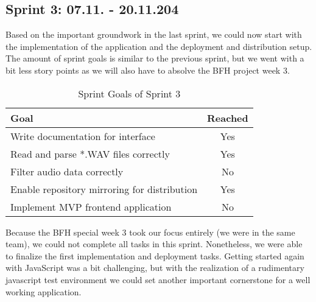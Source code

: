 \subsection{Sprint 3: 07.11. - 20.11.204}\label{subsec:sprint-3}
Based on the important groundwork in the last sprint, we could now start with the implementation of the application
and the deployment and distribution setup.
The amount of sprint goals is similar to the previous sprint, but we went with a bit less story points as we will also
have to absolve the BFH project week 3.
\begin{table}[H]
    \centering
    \begin{tabularx}{\textwidth}{X c}
        \toprule
        \textbf{Goal}                                         & \textbf{Reached} \\
        \midrule
        Write documentation for interface                     & Yes              \\
        \midrule
        Read and parse *.WAV  files correctly                  & Yes              \\
        \midrule
        Filter audio data correctly                           & No               \\
        \midrule
        Enable repository mirroring for distribution          & Yes              \\
        \midrule
        Implement MVP frontend application                    & No               \\
        \bottomrule
    \end{tabularx}
    \caption{Sprint Goals of Sprint 3}\label{tab:sprint_goals3}
\end{table}
Because the BFH special week 3 took our focus entirely (we were in the same team),
we could not complete all tasks in this sprint.
Nonetheless, we were able to finalize the first implementation and deployment tasks.
Getting started again with JavaScript was a bit challenging,
but with the realization of a rudimentary javascript test environment we could set another important cornerstone for
a well working application.

